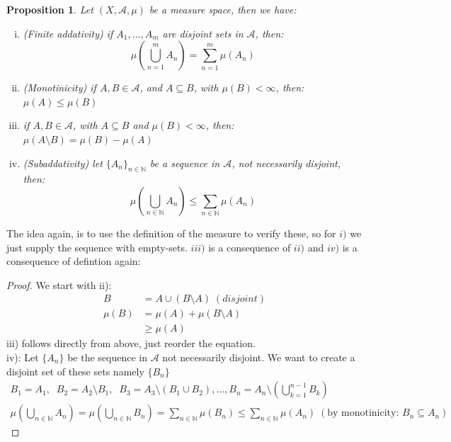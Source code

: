 \documentclass{article}
\newcommand{\N}{\mathbb{N}}
\newcommand{\A}{\mathcal{A}}
\newtheorem{prop}{Proposition}
\newtheorem{proof}{Proof}
\begin{document}
\begin{prop}
Let $(X,\A, \mu)$ be a measure space, then we have: 
\begin{enumerate}[i)]
    \item (Finite addativity) if $A_{1}, \dots, A_{m}$ are disjoint sets in $\A$, then: $$\mu\left(\bigcup_{n=1}^{m}A_{n}\right) = \sum_{n=1}^{m}\mu(A_{n})$$
    \item (Monotinicity) if $A,B \in \A$, and $A\subseteq B$, with $\mu(B) < \infty$, then:\\ $\mu(A)\leq \mu(B)$ 
    \item if $A,B\in \A$, with $A\subseteq B$ and $\mu(B) < \infty$, then: \\
    $\mu\left(A\setminus B\right) = \mu(B) -\mu(A)$ 
    \item (Subaddativity) let $\{A_{n}\}_{n\in \N}$ be a sequence in $\A$, not necessarily disjoint, then: 
    \[\mu\left(\bigcup_{n\in \N}A_{n}\right) \leq \sum_{n\in \N}\mu(A_{n})
    \]
\end{enumerate}
\end{prop}

The idea again, is to use the definition of the measure to verify these, so for $i)$ we just supply the sequence with empty-sets. $iii)$ is a consequence of $ii)$ and $iv)$ is a consequence of defintion again: 

\begin{proof}
We start with ii): 
\begin{align*}
B &= A\cup(B\setminus A)\; (disjoint) \\
\mu(B) &= \mu(A) + \mu(B\setminus A)\\ 
 &\geq \mu(A)
\end{align*} 
iii) follows directly from above, just reorder the equation. \\ 
iv): Let $\{A_{n}\}$ be the sequence in $\A$ not necessarily disjoint. We want to create a disjoint set of these sets namely $\{B_{n}\}$
\begin{align*}
B_{1} = A_{1}, \;\;B_{2}=A_{2}\setminus B_{1},\;\; B_{3} = A_{3}\setminus(B_{1}\cup B_{2}),\dots, B_{n}= A_{n}\setminus(\bigcup_{k=1}^{n-1}B_{k})\\ 
\mu(\bigcup_{n\in \N}A_{n}) = \mu(\bigcup_{n\in \N}B_{n}) = \sum_{n\in \N}\mu(B_{n}) \leq \sum_{n\in \N}\mu(A_{n})\; (\text{by monotinicity: $B_{n}\subseteq A_{n}$})
\end{align*}
\end{proof}
\end{document}
